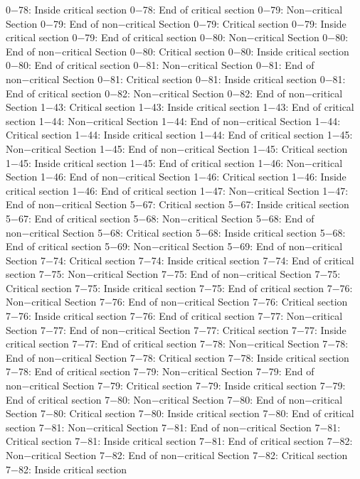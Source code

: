 0−78: Inside critical section
0−78: End of critical section
0−79: Non−critical Section
0−79: End of non−critical Section
0−79: Critical section
0−79: Inside critical section
0−79: End of critical section
0−80: Non−critical Section
0−80: End of non−critical Section
0−80: Critical section
0−80: Inside critical section
0−80: End of critical section
0−81: Non−critical Section
0−81: End of non−critical Section
0−81: Critical section
0−81: Inside critical section
0−81: End of critical section
0−82: Non−critical Section
0−82: End of non−critical Section
1−43: Critical section
1−43: Inside critical section
1−43: End of critical section
1−44: Non−critical Section
1−44: End of non−critical Section
1−44: Critical section
1−44: Inside critical section
1−44: End of critical section
1−45: Non−critical Section
1−45: End of non−critical Section
1−45: Critical section
1−45: Inside critical section
1−45: End of critical section
1−46: Non−critical Section
1−46: End of non−critical Section
1−46: Critical section
1−46: Inside critical section
1−46: End of critical section
1−47: Non−critical Section
1−47: End of non−critical Section
5−67: Critical section
5−67: Inside critical section
5−67: End of critical section
5−68: Non−critical Section
5−68: End of non−critical Section
5−68: Critical section
5−68: Inside critical section
5−68: End of critical section
5−69: Non−critical Section
5−69: End of non−critical Section
7−74: Critical section
7−74: Inside critical section
7−74: End of critical section
7−75: Non−critical Section
7−75: End of non−critical Section
7−75: Critical section
7−75: Inside critical section
7−75: End of critical section
7−76: Non−critical Section
7−76: End of non−critical Section
7−76: Critical section
7−76: Inside critical section
7−76: End of critical section
7−77: Non−critical Section
7−77: End of non−critical Section
7−77: Critical section
7−77: Inside critical section
7−77: End of critical section
7−78: Non−critical Section
7−78: End of non−critical Section
7−78: Critical section
7−78: Inside critical section
7−78: End of critical section
7−79: Non−critical Section
7−79: End of non−critical Section
7−79: Critical section
7−79: Inside critical section
7−79: End of critical section
7−80: Non−critical Section
7−80: End of non−critical Section
7−80: Critical section
7−80: Inside critical section
7−80: End of critical section
7−81: Non−critical Section
7−81: End of non−critical Section
7−81: Critical section
7−81: Inside critical section
7−81: End of critical section
7−82: Non−critical Section
7−82: End of non−critical Section
7−82: Critical section
7−82: Inside critical section
